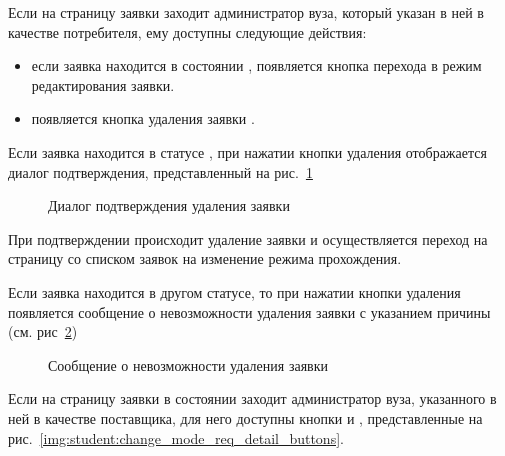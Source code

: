 Если на страницу заявки заходит администратор вуза, который указан в ней в качестве потребителя, ему доступны 
следующие действия:
\begin{itemize}
	\item если заявка находится в состоянии , появляется кнопка перехода в режим редактирования 
	заявки. 
	\item появляется кнопка удаления заявки .
\end{itemize}

Если заявка находится в статусе , при нажатии кнопки удаления отображается диалог подтверждения, 
представленный на рис.~\ref{img:student:req_change_mode_delete_confirm} 
\begin{figure}[H]
	\caption{Диалог подтверждения удаления заявки}
	\label{img:student:req_change_mode_delete_confirm}
\end{figure}
При подтверждении происходит удаление заявки и осуществляется переход на страницу со списком заявок на изменение 
режима прохождения.

Если заявка находится в другом статусе, то при нажатии кнопки удаления появляется сообщение о невозможности удаления 
заявки с указанием причины (см. рис~\ref{img:student:req_change_mode_cannot_delete})
\begin{figure}[H]
	\caption{Сообщение о невозможности удаления заявки}
	\label{img:student:req_change_mode_cannot_delete}
\end{figure}

Если на страницу заявки в состоянии  заходит администратор вуза, 
указанного в ней в качестве поставщика, для него доступны кнопки  и 
, представленные на рис.~\ref{img:student:change_mode_req_detail_buttons}.

